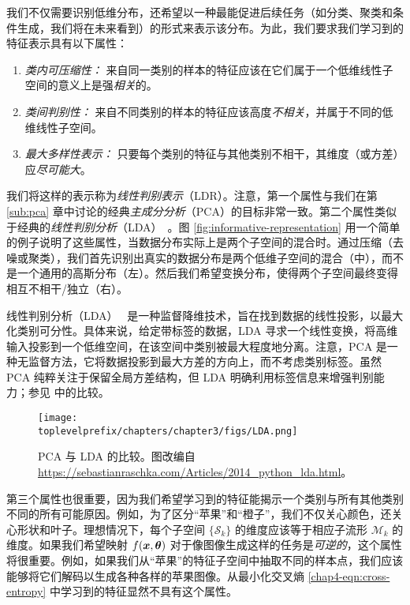 \documentclass[../../book-main_zh.tex]{subfiles}
\begin{document}
我们不仅需要识别低维分布，还希望以一种最能促进后续任务（如分类、聚类和条件生成，我们将在未来看到）的形式来表示该分布。为此，我们要求我们学习到的特征表示具有以下属性：
\begin{enumerate}
	\item {\em 类内可压缩性：} 来自同一类别的样本的特征应该在它们属于一个低维线性子空间的意义上是强{\em 相关}的。
	\item {\em 类间判别性：} 来自不同类别的样本的特征应该高度{\em 不相关}，并属于不同的低维线性子空间。
	\item {\em 最大多样性表示：} 只要每个类别的特征与其他类别不相干，其维度（或方差）应{\em 尽可能大}。
\end{enumerate}
我们将这样的表示称为{\em 线性判别表示}（LDR）。注意，第一个属性与我们在第 \ref{sub:pca} 章中讨论的经典{\em 主成分分析}（PCA）的目标非常一致。第二个属性类似于经典的{\em 线性判别分析}（LDA）~\cite{HastieTiFr09}。图 \ref{fig:informative-representation} 用一个简单的例子说明了这些属性，当数据分布实际上是两个子空间的混合时。通过压缩（去噪或聚类），我们首先识别出真实的数据分布是两个低维子空间的混合（中），而不是一个通用的高斯分布（左）。然后我们希望变换分布，使得两个子空间最终变得相互不相干/独立（右）。

\begin{remark}
    线性判别分析（LDA）~\cite{HastieTiFr09} 是一种监督降维技术，旨在找到数据的线性投影，以最大化类别可分性。具体来说，给定带标签的数据，LDA 寻求一个线性变换，将高维输入投影到一个低维空间，在该空间中类别被最大程度地分离。注意，PCA 是一种无监督方法，它将数据投影到最大方差的方向上，而不考虑类别标签。虽然 PCA 纯粹关注于保留全局方差结构，但 LDA 明确利用标签信息来增强判别能力；参见  中的比较。
\end{remark}

\begin{figure}
	\centering
	\texttt{[image: \\toplevelprefix/chapters/chapter3/figs/LDA.png]}\vspace{-0.1in}
	\caption{PCA 与 LDA 的比较。图改编自 \url{https://sebastianraschka.com/Articles/2014_python_lda.html}。}
	\label{fig:LDA}
\end{figure}


第三个属性也很重要，因为我们希望学习到的特征能揭示一个类别与所有其他类别不同的所有可能原因。例如，为了区分“苹果”和“橙子”，我们不仅关心颜色，还关心形状和叶子。理想情况下，每个子空间 $\{\mathcal{S}_k\}$ 的维度应该等于相应子流形 $\mathcal{M}_k$ 的维度。如果我们希望映射 $f(\bm{x},\bm\theta)$ 对于像图像生成这样的任务是{\em 可逆的}，这个属性将很重要。例如，如果我们从“苹果”的特征子空间中抽取不同的样本点，我们应该能够将它们解码以生成各种各样的苹果图像。从最小化交叉熵 \eqref{chap4-eqn:cross-entropy} 中学习到的特征显然不具有这个属性。
\end{document}
